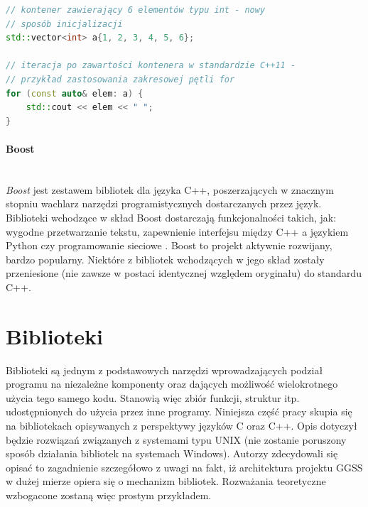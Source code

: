 \begin{lstlisting}[language=c++,caption={Przykład kodu w języku C++ napisany z wykorzystaniem funkcjonalności ze standardu C++11 (zakresowa pętla for)},label={lst:cpp11}]
// kontener zawierający 6 elementów typu int - nowy
// sposób inicjalizacji
std::vector<int> a{1, 2, 3, 4, 5, 6};

// iteracja po zawartości kontenera w standardzie C++11 - 
// przykład zastosowania zakresowej pętli for
for (const auto& elem: a) {
	std::cout << elem << " ";
}
\end{lstlisting}


\paragraph*{Boost}\mbox{} \\
\textit{Boost} jest zestawem bibliotek dla języka C++, poszerzających w znacznym stopniu wachlarz narzędzi programistycznych dostarczanych przez język. Biblioteki wchodzące w skład Boost dostarczają funkcjonalności takich, jak: wygodne przetwarzanie tekstu, zapewnienie interfejsu między C++ a językiem Python czy programowanie sieciowe \cite{BoostDocs}. Boost to projekt aktywnie rozwijany, bardzo popularny. Niektóre z bibliotek wchodzących w jego skład zostały przeniesione (nie zawsze w postaci identycznej względem oryginału) do standardu C++.

\section{Biblioteki}
Biblioteki są jednym z podstawowych narzędzi wprowadzających podział programu na niezależne komponenty oraz dających możliwość wielokrotnego użycia tego samego kodu. Stanowią więc zbiór funkcji, struktur itp. udostępnionych do użycia przez inne programy. Niniejsza część pracy skupia się na bibliotekach opisywanych z perspektywy języków C oraz C++. Opis dotyczył będzie rozwiązań związanych z systemami typu UNIX (nie zostanie poruszony sposób działania bibliotek na systemach Windows). Autorzy zdecydowali się opisać to zagadnienie szczegółowo z uwagi na fakt, iż architektura projektu GGSS w dużej mierze opiera się o mechanizm bibliotek. Rozważania teoretyczne wzbogacone zostaną więc prostym przykładem.

